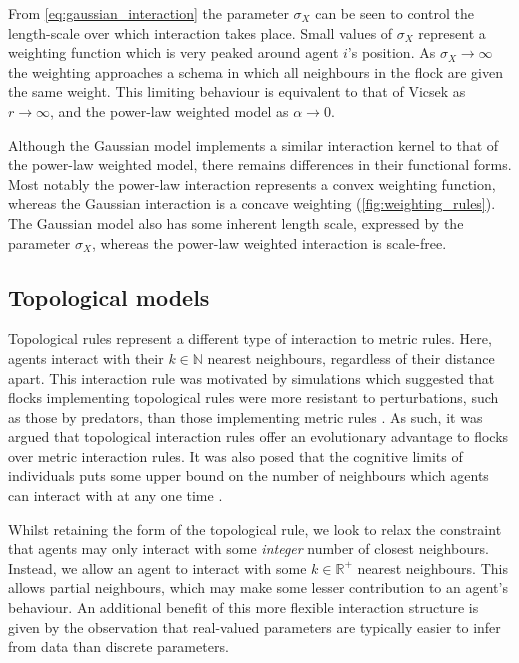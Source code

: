 From \cref{eq:gaussian_interaction} the parameter $\sigma_X$ can be seen to
control the length-scale over which interaction takes place. Small values of
$\sigma_X$ represent a weighting function which is very peaked around agent
$i$'s position. As $\sigma_X \rightarrow \infty$ the weighting approaches a
schema in which all neighbours in the flock are given the same weight. This
limiting behaviour is equivalent to that of Vicsek as $r\rightarrow\infty$, and
the power-law weighted model as $\alpha\rightarrow0$.

Although the Gaussian model implements a similar interaction kernel to that of
the power-law weighted model, there remains differences in their functional
forms. Most notably the power-law interaction represents a convex weighting
function, whereas the Gaussian interaction is a concave weighting
(\cref{fig:weighting_rules}). The Gaussian model also has some inherent length
scale, expressed by the parameter $\sigma_X$, whereas the power-law weighted
interaction is scale-free.

\subsection{Topological models}

Topological rules represent a different type of interaction to metric rules.
Here, agents interact with their $k\in\mathbb{N}$ nearest neighbours,
regardless of their distance apart. This interaction rule was motivated by
simulations which suggested that flocks implementing topological rules were
more resistant to perturbations, such as those by predators, than those
implementing metric rules \parencite{ballerini08,camperi12,ginelli10}. As such,
it was argued that topological interaction rules offer an evolutionary
advantage to flocks over metric interaction rules. It was also posed that the
cognitive limits of individuals puts some upper bound on the number of
neighbours which agents can interact with at any one time
\parencite{giardina08,nieder05}.

Whilst retaining the form of the topological rule, we look to relax the
constraint that agents may only interact with some \emph{integer} number of
closest neighbours. Instead, we allow an agent to interact with some
$k\in\mathbb{R}^+$ nearest neighbours. This allows partial neighbours, which
may make some lesser contribution to an agent's behaviour. An additional
benefit of this more flexible interaction structure is given by the observation
that real-valued parameters are typically easier to infer from data than
discrete parameters.

